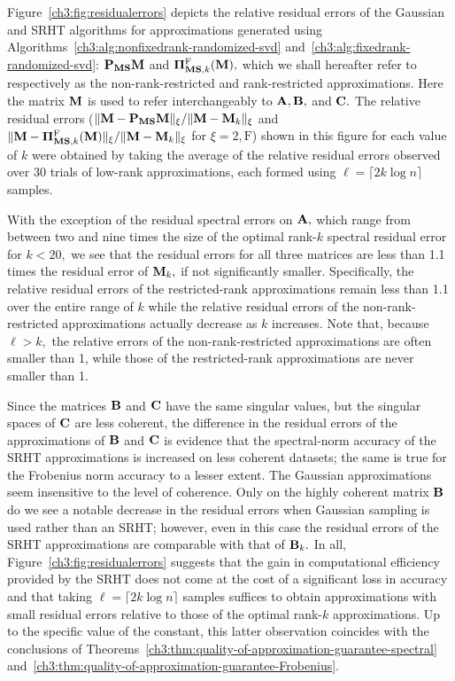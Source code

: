 %
Figure~\ref{ch3:fig:residualerrors} depicts the relative residual errors of 
the Gaussian and SRHT algorithms for approximations generated using 
Algorithms~\ref{ch3:alg:nonfixedrank-randomized-svd} and~\ref{ch3:alg:fixedrank-randomized-svd}:
$\mathbf{P}_{\mathbf{M}\mathbf{S}} \mathbf{M}$ and $\boldsymbol{\Pi}_{\mathbf{M}\mathbf{S}, k}^{\mathrm{F}}(\mathbf{M}),$ which we shall hereafter 
refer to respectively as the non-rank-restricted and rank-restricted 
approximations. Here the matrix $\mathbf{M}$ is used to refer interchangeably to 
$\mathbf{A}, \mathbf{B},$ and $\mathbf{C}.$ The relative residual errors 
($\mbox{}\|\mathbf{M} - \mathbf{P}_{\mathbf{M}\mathbf{S}} \mathbf{M}\|_{\xi}/\mbox{}\|\mathbf{M} - \mathbf{M}_k\|_{\xi}$ 
 and $\mbox{}\|\mathbf{M} - \boldsymbol{\Pi}_{\mathbf{M}\mathbf{S}, k}^{\mathrm{F}}(\mathbf{M})\|_{\xi}/\mbox{}\|\mathbf{M} - \mathbf{M}_k\|_{\xi}$ 
 for $\xi = 2, \mathrm{F}$) shown in this figure for each value of $k$ were 
obtained by taking the average of the relative residual errors observed over 
30 trials of low-rank approximations, each formed using 
$\ell = \lceil 2 k \log n \rceil$ samples.

With the exception of the residual spectral errors on $\mathbf{A},$ 
which range from between two and nine times the size of the optimal rank-$k$ spectral
residual error for $k < 20,$ we see that the residual errors for all three
matrices are less than 1.1 times the residual error of $\mathbf{M}_k,$ if not
significantly smaller. Specifically, the relative residual errors of the
restricted-rank approximations remain less than 1.1 over the entire range of $k$
while the relative residual errors of the non-rank-restricted approximations
actually decrease as $k$ increases.  Note that, because $\ell >k,$ the
relative errors of the non-rank-restricted approximations are often smaller
than 1, while those of the restricted-rank approximations are never smaller
than 1.

Since the matrices $\mathbf{B}$ and $\mathbf{C}$ have the same singular values, but the
singular spaces of $\mathbf{C}$ are less coherent, the difference in the residual errors of
the approximations of $\mathbf{B}$ and $\mathbf{C}$ is evidence that
the spectral-norm accuracy of the SRHT approximations is increased on less
coherent datasets; the same is true for the Frobenius norm accuracy to a lesser
extent. The Gaussian approximations seem insensitive to the level of coherence.
Only on the highly coherent matrix $\mathbf{B}$ do we see a notable decrease in
the residual errors when Gaussian sampling is used rather than an SRHT; however,
even in this case the residual errors of the SRHT approximations are comparable
with that of $\mathbf{B}_k.$ In all, Figure~\ref{ch3:fig:residualerrors} suggests
that the gain in computational efficiency provided by the SRHT does not come at
the cost of a significant loss in accuracy and that taking $\ell = \lceil 2 k \log n
\rceil$ samples suffices to obtain approximations with small residual errors
relative to those of the optimal rank-$k$ approximations. Up to the 
specific
value of the constant, this latter observation coincides with the conclusions of
Theorems~\ref{ch3:thm:quality-of-approximation-guarantee-spectral} 
and~\ref{ch3:thm:quality-of-approximation-guarantee-Frobenius}.

